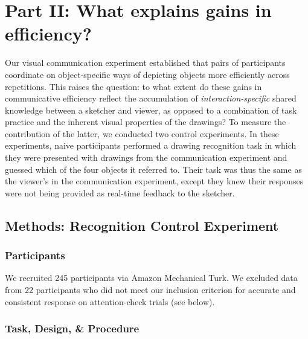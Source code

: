 \documentclass[10pt,letterpaper]{article}
\begin{document}

\section{Part II: What explains gains in efficiency?}

Our visual communication experiment established that pairs of participants coordinate on object-specific ways of depicting objects more efficiently across repetitions.
This raises the question: to what extent do these gains in communicative efficiency reflect the accumulation of \emph{interaction-specific} shared knowledge between a sketcher and viewer, as opposed to a combination of task practice and the inherent visual properties of the drawings?
To measure the contribution of the latter, we conducted two control experiments.
In these experiments, naive participants performed a drawing recognition task in which they were presented with drawings from the communication experiment and guessed which of the four objects it referred to.
Their task was thus the same as the viewer's in the communication experiment, except they knew their responses were not being provided as real-time feedback to the sketcher.


\subsection{Methods: Recognition Control Experiment}

\subsubsection{Participants}

We recruited 245 participants via Amazon Mechanical Turk.
We excluded data from 22 participants who did not meet our inclusion criterion for accurate and consistent response on attention-check trials (see below).

\subsubsection{Task, Design, \& Procedure}
\end{document}

